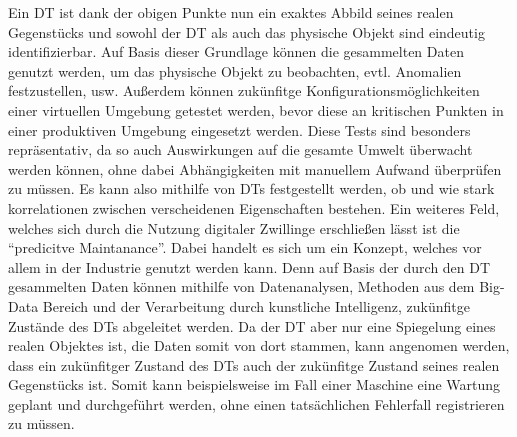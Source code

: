 Ein \ac{DT} ist dank der obigen Punkte nun ein exaktes Abbild seines realen Gegenstücks und sowohl der \ac{DT} als auch das physische Objekt sind eindeutig identifizierbar. Auf Basis dieser Grundlage können die gesammelten Daten genutzt werden, um das physische Objekt zu beobachten, evtl. Anomalien festzustellen, usw. Außerdem können zukünfitge Konfigurationsmöglichkeiten einer virtuellen Umgebung getestet werden, bevor diese an kritischen Punkten in einer produktiven Umgebung eingesetzt werden. Diese Tests sind besonders repräsentativ, da so auch Auswirkungen auf die gesamte Umwelt überwacht werden können, ohne dabei Abhängigkeiten mit manuellem Aufwand überprüfen zu müssen. Es kann also mithilfe von \ac{DT}s festgestellt werden, ob und wie stark korrelationen zwischen verscheidenen Eigenschaften bestehen. Ein weiteres Feld, welches sich durch die Nutzung digitaler Zwillinge erschließen lässt ist die \enquote{predicitve Maintanance}. Dabei handelt es sich um ein Konzept, welches vor allem in der Industrie genutzt werden kann. Denn auf Basis der durch den \ac{DT} gesammelten Daten können mithilfe von Datenanalysen, Methoden aus dem Big-Data Bereich und der Verarbeitung durch kunstliche Intelligenz, zukünfitge Zustände des \ac{DT}s abgeleitet werden. Da der \ac{DT} aber nur eine Spiegelung eines realen Objektes ist, die Daten somit von dort stammen, kann angenomen werden, dass ein zukünfitger Zustand des \ac{DT}s auch der zukünfitge Zustand seines realen Gegenstücks ist. Somit kann beispielsweise im Fall einer Maschine eine Wartung geplant und durchgeführt werden, ohne einen tatsächlichen Fehlerfall registrieren zu müssen.

